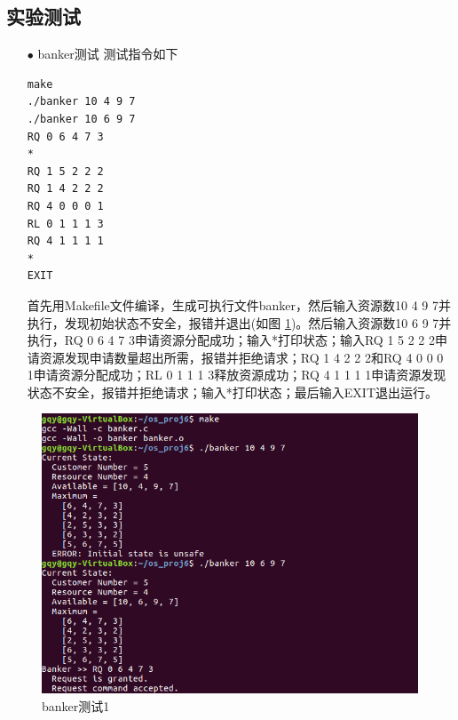\documentclass{article}
\begin{document}
\subsection{实验测试}
\begin{itemize}
\item[$\bullet$]banker测试
测试指令如下
\begin{lstlisting}[language={[ANSI]C}]
make
./banker 10 4 9 7
./banker 10 6 9 7
RQ 0 6 4 7 3
*
RQ 1 5 2 2 2
RQ 1 4 2 2 2
RQ 4 0 0 0 1
RL 0 1 1 1 3
RQ 4 1 1 1 1
*
EXIT
\end{lstlisting}
首先用Makefile文件编译，生成可执行文件banker，然后输入资源数10 4 9 7并执行，发现初始状态不安全，报错并退出(如图 \ref{banker测试1})。然后输入资源数10 6 9 7并执行，RQ 0 6 4 7 3申请资源分配成功；输入*打印状态；输入RQ 1 5 2 2 2申请资源发现申请数量超出所需，报错并拒绝请求；RQ 1 4 2 2 2和RQ 4 0 0 0 1申请资源分配成功；RL 0 1 1 1 3释放资源成功；RQ 4 1 1 1 1申请资源发现状态不安全，报错并拒绝请求；输入*打印状态；最后输入EXIT退出运行。
\end{itemize}
\begin{figure}[htbp]
		\centering
		\includegraphics{b1}
		\caption{banker测试1} \label{banker测试1}
\end{figure}
\end{document}
